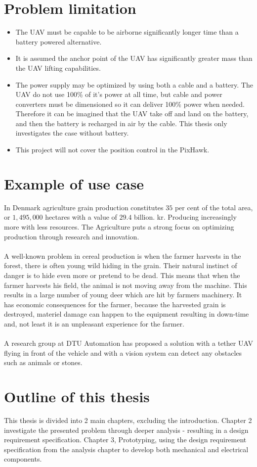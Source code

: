 \section{Problem limitation}
\begin{itemize}
\item The UAV must be capable to be airborne significantly longer time than a battery powered alternative.
\item It is assumed the anchor point of the UAV has significantly greater mass than the UAV lifting capabilities.
\item The power supply may be optimized by using both a cable and a battery. The UAV do not use 100\% of it's power at all time, but cable and power converters must be dimensioned so it can deliver 100\% power when needed. Therefore it can be imagined that the UAV take off and land on the battery, and then the battery is recharged in air by the cable. This thesis only investigates the case without battery.
\item This project will not cover the position control in the PixHawk. 
\end{itemize}


\section{Example of use case}

In Denmark agriculture grain production constitutes $35$ per cent of the total area, or $1,495,000$ hectares with a value of $29.4$ billion. kr. Producing increasingly more with less resources. The Agriculture puts a strong focus on optimizing production through research and innovation\cite{FødevarerLandbrug2013}.
\\
\\
A well-known problem in cereal production is when the farmer harvests in the forest, there is often young wild hiding in the grain. Their natural instinct of danger is to hide even more or pretend to be dead. This means that when the farmer harvests his field, the animal is not moving away from the machine. This results in a large number of young deer which are hit by farmers machinery. It has economic consequences for the farmer, because the harvested grain is destroyed, materiel damage can happen to the equipment resulting in down-time and, not least it is an unpleasant experience for the farmer.
\\
\\
A research group at DTU Automation has proposed a solution with a tether UAV flying in front of the vehicle and with a vision system can detect any obstacles such as animals or stones.

\section{Outline of this thesis}
This thesis is divided into 2 main chapters, excluding the introduction. Chapter 2 investigate the presented problem through deeper analysis - resulting in a design requirement specification. Chapter 3, Prototyping, using the design requirement specification from the analysis chapter to develop both mechanical and electrical components.



